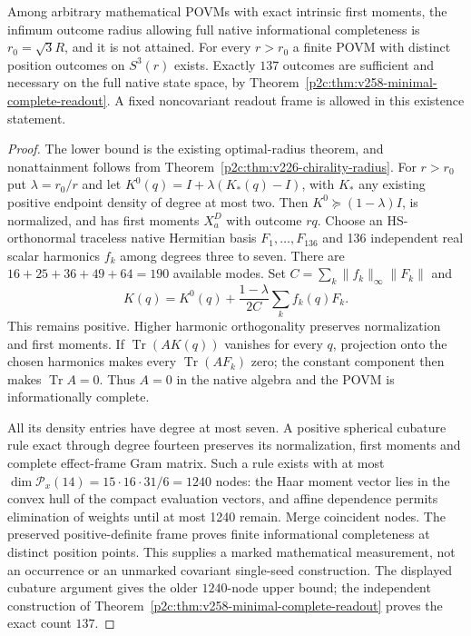 \documentclass[12pt,a4paper]{article}
\begin{document}
\begin{theorem}
\label{p2c:thm:v226-ic-radius-infimum}
Among arbitrary mathematical POVMs with exact intrinsic first moments,
the infimum outcome radius allowing full native informational completeness
is $r_0=\sqrt3R$, and it is not attained. For every $r>r_0$ a finite POVM
with distinct position outcomes on $S^3(r)$ exists. Exactly $137$ outcomes
are sufficient and necessary on the full native state space, by
Theorem~\ref{p2c:thm:v258-minimal-complete-readout}.
A fixed noncovariant readout frame is allowed in this existence statement.
\end{theorem}
\begin{proof}
The lower bound is the existing optimal-radius theorem, and nonattainment
follows from Theorem~\ref{p2c:thm:v226-chirality-radius}.
For $r>r_0$ put $\lambda=r_0/r$ and let
$K^0(q)=I+\lambda(K_*(q)-I)$, with $K_*$ any existing positive endpoint
density of degree at most two. Then $K^0\succeq(1-\lambda)I$, is normalized,
and has first moments $X_a^D$ with outcome $rq$.
Choose an HS-orthonormal traceless native Hermitian basis $F_1,\ldots,F_{136}$
and 136 independent real scalar harmonics $f_k$ among degrees three to
seven. There are $16+25+36+49+64=190$ available modes.
Set $C=\sum_k\|f_k\|_\infty\|F_k\|$ and
\[
 K(q)=K^0(q)+\frac{1-\lambda}{2C}\sum_k f_k(q)F_k.
\]
This remains positive. Higher harmonic orthogonality preserves normalization
and first moments. If $\operatorname{Tr}(AK(q))$ vanishes for every $q$,
projection onto the chosen harmonics makes every $\operatorname{Tr}(AF_k)$
zero; the constant component then makes $\operatorname{Tr}A=0$.
Thus $A=0$ in the native algebra and the POVM is informationally complete.

All its density entries have degree at most seven. A positive spherical
cubature rule exact through degree fourteen preserves its normalization,
first moments and complete effect-frame Gram matrix. Such a rule exists
with at most $\dim\mathcal P_x(14)=15\cdot16\cdot31/6=1240$ nodes:
the Haar moment vector lies in the convex hull of the compact evaluation
vectors, and affine dependence permits elimination of weights until at
most 1240 remain. Merge coincident nodes. The preserved positive-definite
frame proves finite informational completeness at distinct position points.
This supplies a marked mathematical measurement, not an occurrence or an
unmarked covariant single-seed construction. The displayed cubature argument
gives the older $1240$-node upper bound; the independent construction of
Theorem~\ref{p2c:thm:v258-minimal-complete-readout} proves the exact count $137$.
\end{proof}
\end{document}
